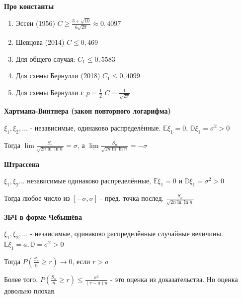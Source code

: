 \begin{remark}
    \textbf{Про константы}

    \begin{enumerate}
        \item {
            Эссен (1956) $C \geqslant \frac{3 + \sqrt{10}}{6 \sqrt{2 \pi}} \approx 0,4097$
        }
        \item {
            Шевцова (2014) $C \leqslant 0,469$
        }
        \item {
            Для общего случая: $C_1 \leqslant 0,5583$
        }
        \item {
            Для схемы Бернулли (2018) $C_1 \leqslant 0,4099$
        }
        \item {
            Для схемы Бернулли с $p = \frac{1}{2}$ $C = \frac{1}{\sqrt{2\pi}}$
        }
    \end{enumerate}
\end{remark}

\begin{theorem}
    \textbf{Хартмана-Винтнера (закон повторного логарифма)}

    $\xi_1, \xi_2, \ldots$ - независимые, одинаково распределённые. $\mathbb{E} \xi_1 = 0, \, \mathbb{D} \xi_1 = \sigma^2 > 0$

    Тогда $\overline{\lim} \frac{S_n}{\sqrt{2n \ln \ln n}} = \sigma$, а $\underline{\lim} \frac{S_n}{\sqrt{2n \ln \ln n}} = -\sigma$
\end{theorem}

\begin{theorem}
    \textbf{Штрассена}

    $\xi_1, \xi_2 \ldots$ независимые одинаково распределённые, $\mathbb{E} \xi_1 = 0$ и $\mathbb{D} \xi_1 = \sigma^2 > 0$

    Тогда любое число из $[-\sigma, \sigma]$ - пред. точка послед. $\frac{S_n}{\sqrt{2n \ln \ln n}}$
\end{theorem}



 \textbf{ЗБЧ в форме Чебышёва}

 $\xi_1, \xi_2, \ldots$ - незаисимые, одинаково распределённые случайные величины. $\mathbb{E} \xi_1 = a, \mathbb{D} = \sigma^2 > 0$

 Тогда $P\left(\frac{S_n}{n} \geqslant r \right) \rightarrow 0$, если $r > a$

 Более того, $P \left( \frac{S_n}{n} \geqslant r \right) \leqslant \frac{\sigma^2}{(r - a)n}$ - это оценка из доказательства. Но оценка довольно плохая.

